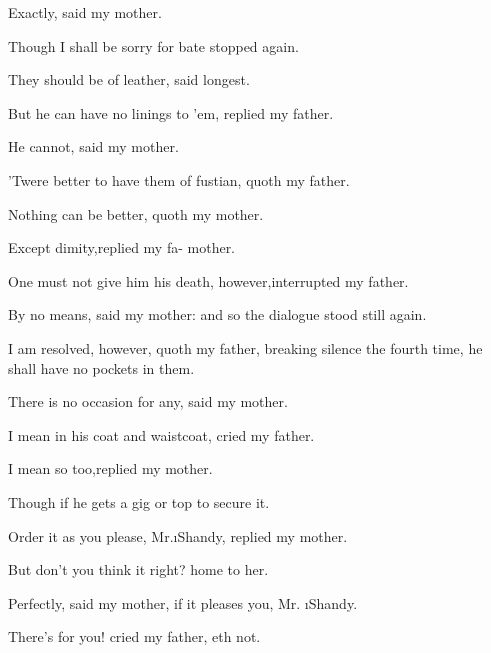 \documentclass[twoside]{article}
\begin{document}
Exactly, said my mother.\tsh

\tsh Though I shall be sorry for\break
{}
bate stopped again.

\tsh They should be of leather, said\break
{}
longest.

But he can have no linings to ’em,\break
replied my father.\tsh

He cannot, said my mother.

’Twere better to have them of fustian,\break
quoth my father.

Nothing can be better, quoth my\break
mother.\tsh

\tsh Except dimity,\tsk replied my fa-\break 
{}
mother.

\tsh One must not give him his death,\break
however,\tsk interrupted my father.

By no means, said my mother:\tsh\break
and so the dialogue stood still again.


\topstrut I am resolved, however, quoth my\break 
father, breaking silence the fourth time,\break
he shall have no pockets in them.\tsh

\tsk There is no occasion for any,\break
said my mother.\tsh

I mean in his coat and waistcoat,\tsk\break
cried my father.

\tsk I mean so too,\tsk replied my\break
mother.

\tsk Though if he gets a gig or top\break
{}
to secure it.\tsh

Order it as you please, Mr.\@ \i{Shandy}, replied my
mother.\tsh


\tsh But don’t you think it right?\break
{}
home to her.

Perfectly, said my mother, if it pleases\break
you, Mr. \i{Shandy.}\tsh

\tsh There’s for you! cried my father,\break
{}
eth not.
\end{document}
